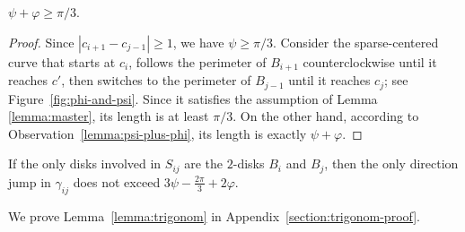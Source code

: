 \begin{enumerate}[label={\bf Case \arabic*: }, wide, labelwidth=!, labelindent=0pt]
\begin{observation}
$\psi + \varphi\geq \pi/3$.
\end{observation}

\begin{proof}
Since $|c_{i+1} - c_{j-1}| \geq 1$, we have $\psi\geq\pi/3$. Consider the sparse-centered curve that starts at $c_i$, follows the perimeter of $B_{i+1}$ counterclockwise until it reaches $c'$, then switches to the perimeter of $B_{j-1}$ until it reaches $c_j$; see Figure~\ref{fig:phi-and-psi}. Since it satisfies the assumption of Lemma \ref{lemma:master}, its length is at least $\pi/3$. On the other hand, according to Observation~\ref{lemma:psi-plus-phi}, its length is exactly $\psi + \varphi$.
\end{proof}


\begin{lemma}\label{lemma:trigonom}
If the only disks involved in $S_{ij}$ are the $2$-disks $B_i$ and $B_j$, then the only direction jump in $\gamma_{ij}$ does not exceed
$3\psi - \frac{2\pi}{3} + 2\varphi$.
\end{lemma}

We prove Lemma~\ref{lemma:trigonom} in Appendix~\ref{section:trigonom-proof}.





\end{enumerate}
